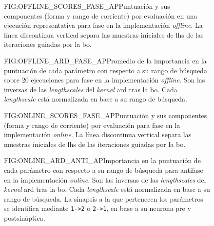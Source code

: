 \begin{figure}[Puntuación y sus componentes por evaluación en una ejecución representativa de la \acl{bo} \textit{offline} en fase]{FIG:OFFLINE_SCORES_FASE_AP}{Puntuación y sus componentes (forma y rango de corriente) por evaluación en una ejecución representativa para fase en la implementación \textit{offline}. La línea discontinua vertical separa las muestras iniciales de \ac{lhs} de las iteraciones guiadas por la \ac{bo}.}
\end{figure}

\begin{figure}[Promedio de la importancia en la puntuación de los parámetros de la \acl{bo} \textit{offline} en fase]{FIG:OFFLINE_ARD_FASE_AP}{Promedio de la importancia en la puntuación de cada parámetro con respecto a su rango de búsqueda sobre 20 ejecuciones para fase en la implementación \textit{offline}. Son las inversas de las \textit{lengthscales} del \textit{kernel} \ac{ard} tras la \ac{bo}. Cada \textit{lengthscale} está normalizada en base a su rango de búsqueda.}
\end{figure}


\begin{figure}[Puntuación y sus componentes por evaluación de la \acl{bo} \textit{online} en fase]{FIG:ONLINE_SCORES_FASE_AP}{Puntuación y sus componentes (forma y rango de corriente) por evaluación para fase en la implementación \textit{online}. La línea discontinua vertical separa las muestras iniciales de \ac{lhs} de las iteraciones guiadas por la \ac{bo}.}
\end{figure}

\begin{figure}[Importancia en la puntuación de los parámetros de la \acl{bo} \textit{online} en antifase]{FIG:ONLINE_ARD_ANTI_AP}{Importancia en la puntuación de cada parámetro con respecto a su rango de búsqueda para antifase en la implementación \textit{online}. Son las inversas de las \textit{lengthscales} del \textit{kernel} \ac{ard} tras la \ac{bo}. Cada \textit{lengthscale} está normalizada en base a su rango de búsqueda. La sinapsis a la que pertenecen los parámetros se identifica mediante \texttt{1->2} o \texttt{2->1}, en base a su neurona pre y postsináptica.}
\end{figure}

